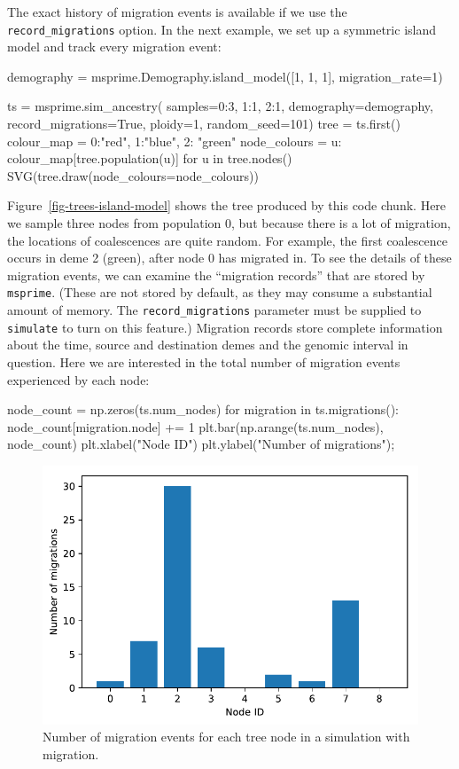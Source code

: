 \documentclass[graybox]{svmult}
\newcommand{\msprime}[0]{\texttt{msprime}}
\begin{document}
The exact history of migration events is available if we use the
\texttt{record\_migrations} option. In the next example, we set up a
symmetric island model and track every migration event:

\begin{pythoncode}
demography =  msprime.Demography.island_model([1, 1, 1], migration_rate=1)

ts  = msprime.sim_ancestry(
    samples={0:3, 1:1, 2:1},
    demography=demography,
    record_migrations=True,
    ploidy=1,
    random_seed=101)
tree = ts.first()
colour_map = {0:"red", 1:"blue", 2: "green"}
node_colours = {u: colour_map[tree.population(u)] for u in tree.nodes()}
SVG(tree.draw(node_colours=node_colours))
\end{pythoncode}

Figure~\ref{fig-trees-island-model} shows the tree produced by this code
chunk. Here we sample three nodes from population 0, but because there is a lot of migration, the locations of coalescences are quite random. For
example, the first coalescence occurs in deme 2 (green), after node 0
has migrated in. To see the details of these migration events, we can
examine the ``migration records'' that are stored by \msprime. (These are
not stored by default, as they may consume a substantial amount of memory.
The \texttt{record\_migrations} parameter must be
supplied to \texttt{simulate} to turn on this feature.) Migration
records store complete information about the time, source and
destination demes and the genomic interval in question. Here we are
interested in the total number of migration events experienced by each node:

\begin{pythoncode}
node_count = np.zeros(ts.num_nodes)
for migration in ts.migrations():
    node_count[migration.node] += 1
plt.bar(np.arange(ts.num_nodes), node_count)
plt.xlabel("Node ID")
plt.ylabel("Number of migrations");
\end{pythoncode}

\begin{figure}[t]
\begin{center}
\includegraphics[width=\textwidth]{images/plot_5.pdf}
\end{center}
\caption{\label{fig:migration_counts} Number of migration events for
each tree node in a simulation with migration.}
\end{figure}
\end{document}
